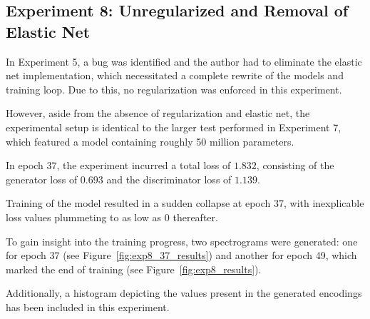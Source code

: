 \subsection{Experiment 8: Unregularized and Removal of Elastic Net} \label{sec:exp8}

In Experiment 5, a bug was identified and the author had to eliminate the elastic net implementation, which necessitated a complete rewrite of the models and training loop. Due to this, no regularization was enforced in this experiment.

However, aside from the absence of regularization and elastic net, the experimental setup is identical to the larger test performed in Experiment 7, which featured a model containing roughly 50 million parameters.

In epoch 37, the experiment incurred a total loss of $1.832$, consisting of the generator loss of $0.693$ and the discriminator loss of $1.139$.

Training of the model resulted in a sudden collapse at epoch 37, with inexplicable loss values plummeting to as low as 0 thereafter.

To gain insight into the training progress, two spectrograms were generated: one for epoch 37 (see Figure~\ref{fig:exp8_37_results}) and another for epoch 49, which marked the end of training (see Figure~\ref{fig:exp8_results}).

Additionally, a histogram depicting the values present in the generated encodings has been included in this experiment.

